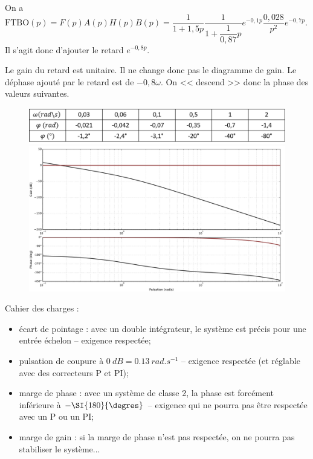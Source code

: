 \ifprof
\begin{corrige}
On a $\text{FTBO}(p)=F(p)A(p)H(p)B(p)=\dfrac{1}{1 + 1,5p} \dfrac{1}{1+\dfrac{1}{0,87}p}e^{-0,1 p}  \dfrac{0,028}{p^2} e^{-0,7p}$. Il s'agit donc d'ajouter le retard $e^{-0,8 p}$.

Le gain du retard est unitaire. Il ne change donc pas le diagramme de gain.
Le déphase ajouté par le retard est de $-0,8\omega $. 
On << descend >> donc la phase des valeurs suivantes. 

\begin{figure}[H]
\centering
\includegraphics[width=.8\linewidth]{images/cor_q16}
\includegraphics[width=.8\linewidth]{images/cor_q16_bode}
\end{figure}

Cahier des charges :
\begin{itemize}
\item écart de pointage : avec un double intégrateur, le système est précis pour une entrée échelon -- exigence respectée;
\item pulsation de coupure à $\SI{0}{dB}= \SI{0,13}{rad.s^{-1}}$ -- exigence respectée (et réglable avec des correcteurs P et PI);
\item marge de phase : avec un système de classe 2, la phase est forcément inférieure à $-\SI{180}{\degres}$ -- exigence qui ne pourra pas être respectée avec un P ou un PI;
\item marge de gain : si la marge de phase n'est pas respectée, on ne pourra pas stabiliser le système...
\end{itemize}

\end{corrige}
\else
\fi


